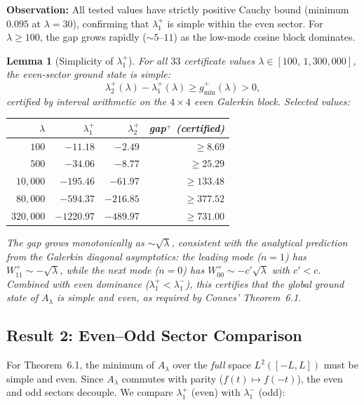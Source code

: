 \documentclass[12pt,a4paper]{article}
\newtheorem{lemma}[theorem]{Lemma}
\theoremstyle{definition}
\theoremstyle{remark}
\begin{document}
\medskip\noindent
\textbf{Observation:} All tested values have strictly positive Cauchy bound (minimum $0.095$ at $\lambda=30$), confirming that $\lambda_1^+$ is simple within the even sector. For $\lambda \geq 100$, the gap grows rapidly ($\sim 5$--$11$) as the low-mode cosine block dominates.

\begin{lemma}[Simplicity of $\lambda_1^+$]
\label{lem:simplicity}
For all $33$ certificate values $\lambda \in [100,\, 1{,}300{,}000]$, the even-sector ground state is simple:
\[
  \lambda_2^+(\lambda) - \lambda_1^+(\lambda) \geq g_{\min}^+(\lambda) > 0,
\]
certified by interval arithmetic on the $4 \times 4$ even Galerkin block. Selected values:

\medskip
\begin{center}
\renewcommand{\arraystretch}{1.15}
\begin{tabular}{r|r|r|r}
$\lambda$ & $\lambda_1^+$ & $\lambda_2^+$ & gap$^+$ (certified) \\\hline
$100$ & $-11.18$ & $-2.49$ & $\geq 8.69$ \\
$500$ & $-34.06$ & $-8.77$ & $\geq 25.29$ \\
$10{,}000$ & $-195.46$ & $-61.97$ & $\geq 133.48$ \\
$80{,}000$ & $-594.37$ & $-216.85$ & $\geq 377.52$ \\
$320{,}000$ & $-1220.97$ & $-489.97$ & $\geq 731.00$
\end{tabular}
\end{center}

\medskip\noindent
The gap grows monotonically as $\sim\!\sqrt{\lambda}$, consistent with the analytical prediction from the Galerkin diagonal asymptotics: the leading mode ($n = 1$) has $W_{11}^+ \sim -\sqrt{\lambda}$, while the next mode ($n = 0$) has $W_{00}^+ \sim -c'\sqrt{\lambda}$ with $c' < c$. Combined with even dominance ($\lambda_1^+ < \lambda_1^-$), this certifies that the global ground state of $A_\lambda$ is simple and even, as required by Connes' Theorem~6.1.
\end{lemma}

\subsection{Result 2: Even--Odd Sector Comparison}

For Theorem~6.1, the minimum of $A_\lambda$ over the \emph{full} space $L^2([-L,L])$ must be simple and even. Since $A_\lambda$ commutes with parity ($f(t)\mapsto f(-t)$), the even and odd sectors decouple. We compare $\lambda_1^+$ (even) with $\lambda_1^-$ (odd):
\end{document}
